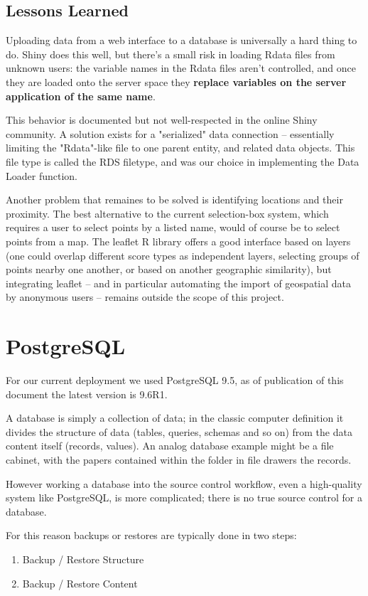 \documentclass[logos,parttoc,morelanguage=french,morelanguage=german,draft]{orsay-memoire}
\begin{document}
\subsection{Lessons Learned}
Uploading data from a web interface to a database is universally a hard thing to do. Shiny does this well, but there's a small risk in loading Rdata files from unknown users: the variable names in the Rdata files aren't controlled, and once they are loaded onto the server space they \textbf{replace variables on the server application of the same name}.

This behavior is documented but not well-respected in the online Shiny community. A solution exists for a "serialized" data connection -- essentially limiting the "Rdata"-like file to one parent entity, and related data objects. This file type is called the RDS filetype, and was our choice in implementing the Data Loader function.

Another problem that remaines to be solved is identifying locations and their proximity. The best alternative to the current selection-box system, which requires a user to select points by a listed name, would of course be to select points from a map. The leaflet R library offers a good interface based on layers (one could overlap different score types as independent layers, selecting groups of points nearby one another, or based on another geographic similarity), but integrating leaflet -- and in particular automating the import of geospatial data by anonymous users -- remains outside the scope of this project.


\section{PostgreSQL}

For our current deployment we used PostgreSQL 9.5, as of publication of this document the latest version is 9.6R1.

A database is simply a collection of data; in the classic computer definition it divides the structure of data (tables, queries, schemas and so on) from the data content itself (records, values). An analog database example might be a file cabinet, with the papers contained within the folder in file drawers the records.

However working a database into the source control workflow, even a high-quality system like PostgreSQL, is more complicated; there is no true source control for a database.

For this reason backups or restores are typically done in two steps:
\begin{enumerate}
\item Backup / Restore Structure
\item Backup / Restore Content
\end{enumerate}
\end{document}
